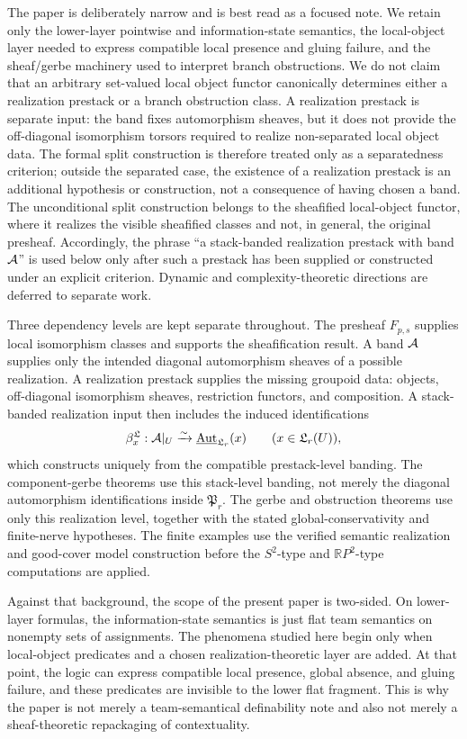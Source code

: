 The paper is deliberately narrow and is best read as a focused note. We retain only the lower-layer pointwise and information-state semantics, the local-object layer needed to express compatible local presence and gluing failure, and the sheaf/gerbe machinery used to interpret branch obstructions. We do not claim that an arbitrary set-valued local object functor canonically determines either a realization prestack or a branch obstruction class. A realization prestack is separate input: the band fixes automorphism sheaves, but it does not provide the off-diagonal isomorphism torsors required to realize non-separated local object data. The formal split construction is therefore treated only as a separatedness criterion; outside the separated case, the existence of a realization prestack is an additional hypothesis or construction, not a consequence of having chosen a band. The unconditional split construction belongs to the sheafified local-object functor, where it realizes the visible sheafified classes and not, in general, the original presheaf. Accordingly, the phrase ``a stack-banded realization prestack with band $\mathcal{A}$'' is used below only after such a prestack has been supplied or constructed under an explicit criterion. Dynamic and complexity-theoretic directions are deferred to separate work.

Three dependency levels are kept separate throughout. The presheaf $F_{p,s}$ supplies local isomorphism classes and supports the sheafification result. A band $\mathcal{A}$ supplies only the intended diagonal automorphism sheaves of a possible realization. A realization prestack supplies the missing groupoid data: objects, off-diagonal isomorphism sheaves, restriction functors, and composition. A stack-banded realization input then includes the induced identifications
\[
\beta^{\mathfrak L}_x:\mathcal{A}|_U\xrightarrow{\sim}
\underline{\mathrm{Aut}}_{\mathfrak L_r}(x)
\qquad (x\in\mathfrak L_r(U)),
\]
which  constructs uniquely from the compatible prestack-level banding. The component-gerbe theorems use this stack-level banding, not merely the diagonal automorphism identifications inside $\mathfrak P_r$. The gerbe and obstruction theorems use only this realization level, together with the stated global-conservativity and finite-nerve hypotheses. The finite examples use the verified semantic realization and good-cover model construction before the $S^2$-type and $\mathbb{R}P^2$-type computations are applied.

Against that background, the scope of the present paper is two-sided. On lower-layer formulas, the information-state semantics is just flat team semantics on nonempty sets of assignments. The phenomena studied here begin only when local-object predicates and a chosen realization-theoretic layer are added. At that point, the logic can express compatible local presence, global absence, and gluing failure, and these predicates are invisible to the lower flat fragment. This is why the paper is not merely a team-semantical definability note and also not merely a sheaf-theoretic repackaging of contextuality.

